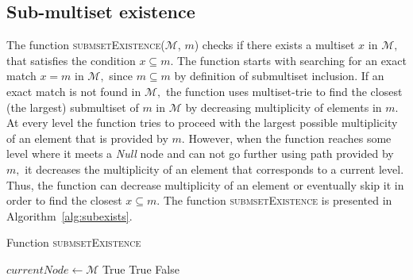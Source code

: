 \subsection{Sub-multiset existence} \label{s:subexists}
The function \textsc{submsetExistence}($\mathcal{M}$, $m$) checks if there exists 
a multiset $x$ in $\mathcal{M},$ that satisfies the condition $x\subseteq m.$ 
The function starts with searching for an exact match $x=m$ in $\mathcal{M},$ 
since $m\subseteq m$ by definition of submultiset inclusion. If an exact match is 
not found in $\mathcal{M},$ the function uses multiset-trie to find the closest 
(the largest) submultiset of $m$ in $\mathcal{M}$ by decreasing multiplicity of 
elements in $m.$ At every level the function tries to proceed with the largest 
possible multiplicity of an element that is provided by $m.$ However, when the 
function reaches some level where it meets a \emph{Null} node and can not go 
further using path provided by $m,$ it decreases the multiplicity of an element 
that corresponds to a current level. Thus, the function can decrease multiplicity 
of an element or eventually skip it in order to find the closest $x\subseteq m.$ 
The function \textsc{submsetExistence} is presented in Algorithm~\ref{alg:subexists}.


\begin{algorithm}[h!]
\caption{Function \textsc{submsetExistence}}
\label{alg:subexists}
\begin{algorithmic}[1]
\State $currentNode \gets \mathcal{M}$
\State \Return True
\EndIf
{}
\State \Return True
\EndIf
\EndIf
\EndFor
\State \Return False
\EndFunction
\end{algorithmic}
\end{algorithm}

